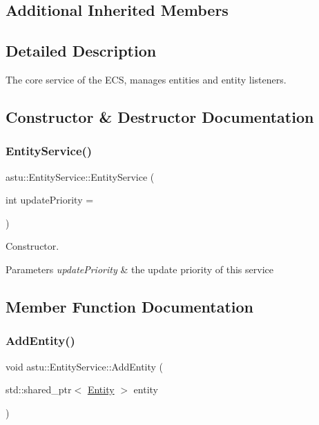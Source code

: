 \subsection*{Additional Inherited Members}


\subsection{Detailed Description}
The core service of the E\+CS, manages entities and entity listeners. 

\subsection{Constructor \& Destructor Documentation}
\mbox{\label{classastu_1_1EntityService_af52258e21a92cd45a68482d0654fe0c7}} 
\subsubsection{\texorpdfstring{Entity\+Service()}{EntityService()}}
{\footnotesize\ttfamily astu\+::\+Entity\+Service\+::\+Entity\+Service (\begin{DoxyParamCaption}\item[{int}]{update\+Priority = {} }\end{DoxyParamCaption})}

Constructor.


\begin{DoxyParams}{Parameters}
{\em update\+Priority} & the update priority of this service \\
\hline
\end{DoxyParams}


\subsection{Member Function Documentation}
\mbox{\label{classastu_1_1EntityService_ad6c6cb81dc8c48c7688f438571ee5da8}} 
\subsubsection{\texorpdfstring{Add\+Entity()}{AddEntity()}}
{\footnotesize\ttfamily void astu\+::\+Entity\+Service\+::\+Add\+Entity (\begin{DoxyParamCaption}\item[{std\+::shared\+\_\+ptr$<$ \hyperlink{classastu_1_1Entity}{Entity} $>$}]{entity }\end{DoxyParamCaption})}

